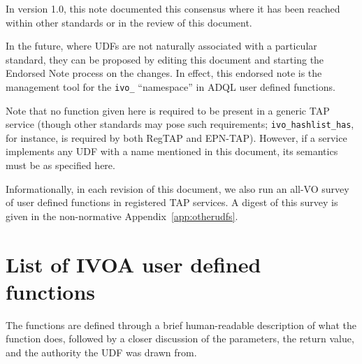 \documentclass[11pt,a4paper]{ivoa}
\begin{document}
In version 1.0, this note documented this consensus where it has been
reached within other standards or in the review of this document.  

In the future, where UDFs are not naturally associated with a
particular standard, they can be proposed by editing this document and
starting the Endorsed Note process \citep{2017ivoa.spec.0517G} on the
changes.  In effect, this endorsed note is the management tool for
the \verb|ivo_| ``namespace'' in ADQL user defined functions.

Note that no function given here is required to be present in a generic
TAP service (though other standards may pose such requirements;
\verb|ivo_hashlist_has|, for instance, is required by both
RegTAP and EPN-TAP).  However, if a service implements any UDF with a
name mentioned in this document, its semantics must be as specified here.

Informationally, in each revision of this document, we also run an
all-VO survey of user defined functions in registered TAP services.  A
digest of this survey is given in the non-normative
Appendix~\ref{app:otherudfs}.







\section{List of IVOA user defined functions}

The functions are defined through a brief human-readable description of
what the function does, followed by a closer discussion of the
parameters, the return value, and the authority the UDF was drawn from.
\end{document}
